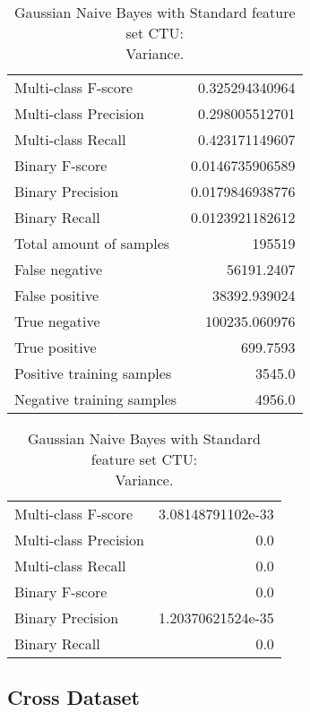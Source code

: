 \begin{table}[H]
\begin{minipage}{0.5\textwidth}
\caption{Gaussian Naive Bayes with Standard feature set CTU: \\Average.}
\centering
\begin{tabular}{l r}
\toprule
Multi-class F-score & 0.325294340964 \\
Multi-class Precision & 0.298005512701 \\
Multi-class Recall & 0.423171149607 \\
\midrule
Binary F-score & 0.0146735906589 \\
Binary Precision & 0.0179846938776 \\
Binary Recall & 0.0123921182612 \\
\midrule
Total amount of samples & 195519 \\
False negative & 56191.2407 \\
False positive & 38392.939024 \\
True negative & 100235.060976 \\
True positive & 699.7593 \\
\midrule
Positive training samples & 3545.0 \\
Negative training samples & 4956.0 \\
\bottomrule
\end{tabular}
\end{minipage}
\hfillx
\begin{minipage}{0.5\textwidth}
\caption{Gaussian Naive Bayes with Standard feature set CTU: \\Variance.}
\centering
\begin{tabular}{l r}
\toprule
Multi-class F-score & 3.08148791102e-33 \\
Multi-class Precision & 0.0 \\
Multi-class Recall & 0.0 \\
\midrule
Binary F-score & 0.0 \\
Binary Precision & 1.20370621524e-35 \\
Binary Recall & 0.0 \\
\bottomrule
\end{tabular}
\end{minipage}
\end{table}

\newpage
\subsection{Cross Dataset}

